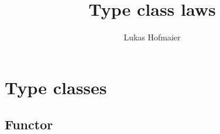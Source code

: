 \documentclass[twoside, a4paper]{article}
\author{Lukas Hofmaier}
\title{Type class laws}
\begin{document}
\maketitle
\tableofcontents

\section{Type classes}
\label{sec:typeclasses}

\subsection{Functor}
\label{sec:functor}
\end{document}
